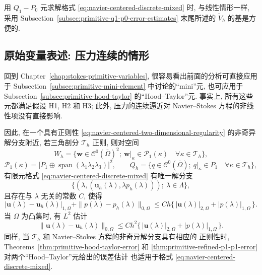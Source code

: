 \setcounter{statement}{0}
\begin{Remark}\label{rem:navier-centered-q1-p0-basis}
用 $Q_1-P_0$ 元求解格式 \eqref{eq:navier-centered-discrete-mixed} 时,
与线性情形一样, 采用 Subsection~\ref{subsec:primitive-q1-p0-error-estimates}
末尾所述的 $\widetilde V_h$ 的基是方便的.
\end{Remark}

\subsection{原始变量表述: 压力连续的情形}
\label{subsec:navier-centered-continuous-pressure}

回到 Chapter~\ref{chap:stokes-primitive-variables}, 很容易看出前面的分析可直接应用于
Subsection~\ref{subsec:primitive-mini-element} 中讨论的``mini''元, 也可应用于
Subsection~\ref{subsec:primitive-hood-taylor} 的``Hood--Taylor''元. 事实上,
所有这些元都满足假设 H1, H2 和 H3; 此外, 压力的连续逼近对
Navier--Stokes 方程的非线性项没有直接影响.

因此, 在一个具有正则性 \eqref{eq:navier-centered-two-dimensional-regularity}
的非奇异解分支附近, 若三角剖分 $\mathcal T_h$ 正则, 则对空间
\[
W_h=\{\boldsymbol w\in\mathcal C^0(\bar\Omega)^2;
\ \boldsymbol w|_\kappa\in\mathcal P_1(\kappa)
\quad\forall\kappa\in\mathcal T_h\},
\]
\[
\mathcal P_1(\kappa)
=\bigl[P_1\oplus\operatorname{span}(\lambda_1\lambda_2\lambda_3)\bigr]^2,
\qquad
Q_h=\{q\in\mathcal C^0(\bar\Omega);
\ q|_\kappa\in P_1\quad\forall\kappa\in\mathcal T_h\},
\]
有限元格式 \eqref{eq:navier-centered-discrete-mixed} 有唯一解分支
\[
\{(\lambda,(\boldsymbol u_h(\lambda),\lambda p_h(\lambda)));
\ \lambda\in\Lambda\},
\]
且存在与 $\lambda$ 无关的常数 $C$, 使得
\[
|\boldsymbol u(\lambda)-\boldsymbol u_h(\lambda)|_{1,\Omega}
+\|p(\lambda)-p_h(\lambda)\|_{0,\Omega}
\leq Ch\{\,|\boldsymbol u(\lambda)|_{2,\Omega}
+|p(\lambda)|_{1,\Omega}\,\}.
\]
当 $\Omega$ 为凸集时, 有 $L^2$ 估计
\[
\|\boldsymbol u(\lambda)-\boldsymbol u_h(\lambda)\|_{0,\Omega}
\leq Ch^2\{\,|\boldsymbol u(\lambda)|_{2,\Omega}
+|p(\lambda)|_{1,\Omega}\,\}.
\]
同样, 当 $\mathcal T_h$ 和 Navier--Stokes 方程的非奇异解分支具有相应的
正则性时, Theorems~\ref{thm:primitive-hood-taylor-error} 和
\ref{thm:primitive-refined-p1-p1-error} 对两个``Hood--Taylor''元给出的误差估计
也适用于格式 \eqref{eq:navier-centered-discrete-mixed}.

